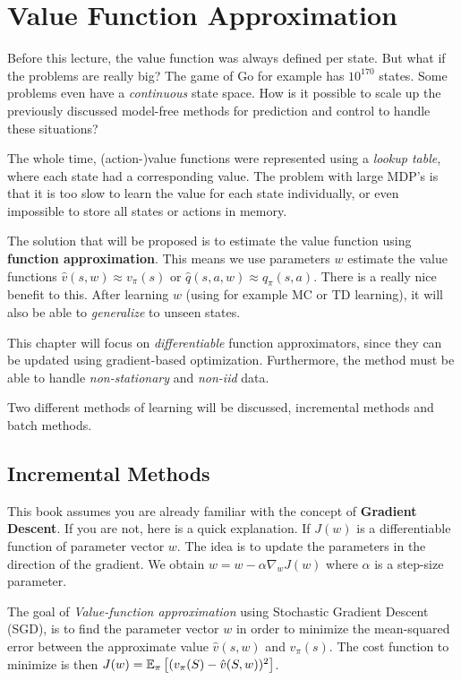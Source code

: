 \chapter{Value Function Approximation}

Before this lecture, the value function was always defined per state. But what if the problems are really big? The game of Go for example has $10^{170}$ states. Some problems even have a \textit{continuous} state space. How is it possible to scale up the previously discussed model-free methods for prediction and control to handle these situations?

The whole time, (action-)value functions were represented using a \textit{lookup table}, where each state had a corresponding value. The problem with large MDP's is that it is too slow to learn the value for each state individually, or even impossible to store all states or actions in memory.

The solution that will be proposed is to estimate the value function using \textbf{function approximation}. This means we use parameters $w$ estimate the value functions $\hat{v}(s, w) \approx v_\pi(s)$ or $\hat{q}(s, a, w) \approx q_\pi(s, a)$. There is a really nice benefit to this. After learning $w$ (using for example MC or TD learning), it will also be able to \textit{generalize} to unseen states.

This chapter will focus on \textit{differentiable} function approximators, since they can be updated using gradient-based optimization. Furthermore, the method must be able to handle \textit{non-stationary} and \textit{non-iid} data.

Two different methods of learning will be discussed, incremental methods and batch methods.

\section{Incremental Methods}

This book assumes you are already familiar with the concept of \textbf{Gradient Descent}. If you are not, here is a quick explanation. If $J(w)$ is a differentiable function of parameter vector $w$. The idea is to update the parameters in the direction of the gradient. We obtain $w = w - \alpha \nabla_w J(w)$ where $\alpha$ is a step-size parameter.

The goal of \textit{Value-function approximation} using Stochastic Gradient Descent (SGD), is to find the parameter vector $w$ in order to minimize the mean-squared error between the approximate value $\hat{v}(s, w)$ and $v_\pi(s)$. The cost function to minimize is then $J(w) = \operatorname{\mathbb{E}}_\pi \left[(v_\pi(S) - \hat{v}(S, w))^2\right]$.

